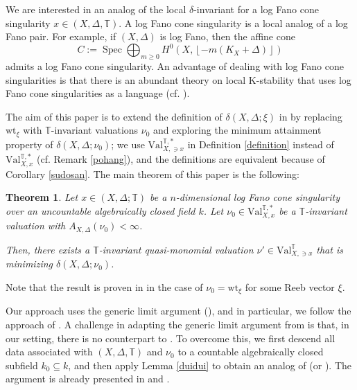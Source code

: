 \documentclass[a4paper,12pt]{amsart}
\newtheorem{theorem}{Theorem}[section]
\theoremstyle{definition} %
\theoremstyle{remark}
\numberwithin{equation}{section}
\def\Spec{\operatorname{Spec}}
\newcommand{\floor}[1]{\left\lfloor #1 \right\rfloor}
\begin{document}
\smallskip

We are interested in an analog of the local $\delta$-invariant for a log Fano cone singularity $x\in (X,\Delta,\mathbb{T})$. A log Fano cone singularity is a local analog of a log Fano pair. For example, if $(X,\Delta)$ is log Fano, then the affine cone
$$ C:=\Spec \bigoplus_{m\ge 0}H^0(X,\floor{-m(K_X+\Delta)}) $$
admits a log Fano cone singularity. An advantage of dealing with log Fano cone singularities is that there is an abundant theory on local K-stability that uses log Fano cone singularities as a language (cf. \cite{Li17, LX18, LX20, Zhu24a, Zhu24, XZ25, LW24, Wan25}).

\smallskip

The aim of this paper is to extend the definition of $\delta(X,\Delta;\xi)$ in \cite{Hua22, LW24, Wan25} by replacing $\mathrm{wt}_{\xi}$ with $\mathbb{T}$-invariant valuations $\nu_0$ and exploring the minimum attainment property of $\delta(X,\Delta;\nu_0)$; we use $\mathrm{Val}^{\mathbb{T},*}_{X,\ni x}$ in Definition \ref{definition} instead of $\mathrm{Val}^{\mathbb{T},*}_{X,x}$ (cf. Remark \ref{pohang}), and the definitions are equivalent because of Corollary \ref{sudosan}. The main theorem of this paper is the following:

\begin{theorem} \label{누영이}
Let $x\in (X,\Delta;\mathbb{T})$ be a $n$-dimensional log Fano cone singularity over an uncountable algebraically closed field $k$. Let $\nu_0\in \mathrm{Val}^{\mathbb{T},*}_{X,x}$ be a $\mathbb{T}$-invariant valuation with $A_{X,\Delta}(\nu_0)<\infty$.

\smallskip

Then, there exists a $\mathbb{T}$-invariant quasi-monomial valuation $\nu'\in \mathrm{Val}^{\mathbb{T}}_{X,\ni x}$ that is minimizing $\delta(X,\Delta;\nu_0)$.
\end{theorem}

Note that the result is proven in \cite[Theorem 5.0.4]{Hua22} in the case of $\nu_0=\mathrm{wt}_{\xi}$ for some Reeb vector $\xi$.

\smallskip

Our approach uses the generic limit argument (\cite{dFM09, dFEM10, Blu18, BJ20}), and in particular, we follow the approach of \cite{BJ20}. A challenge in adapting the generic limit argument from \cite{BJ20} is that, in our setting, there is no counterpart to \cite[Proposition 6.3]{BJ20}. To overcome this, we first descend all data associated with $(X,\Delta,\mathbb{T})$ and $\nu_0$ to a countable algebraically closed subfield $k_0\subseteq k$, and then apply Lemma \ref{duidui} to obtain an analog of \cite[Proposition 6.7]{BJ20} (or \cite[Lemma 3.21]{BLXZ25}). The argument is already presented in \cite[Theorem 4.1]{Tot12} and \cite[Proposition 3.9]{LX20}.
\end{document}
